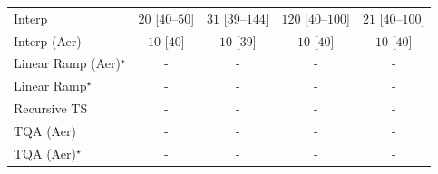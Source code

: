 \begin{tabular}{l|cccc|}
Interp & {\cellcolor[HTML]{F5FBF3}} \color[HTML]{000000} $20$ [$40$--$50$] & {\cellcolor[HTML]{F3FAF0}} \color[HTML]{000000} $31$ [$39$--$144$] & {\cellcolor[HTML]{DCF2D7}} \color[HTML]{000000} $120$ [$40$--$100$] & {\cellcolor[HTML]{F5FBF2}} \color[HTML]{000000} $21$ [$40$--$100$] \\
Interp (Aer) & {\cellcolor[HTML]{F7FCF5}} \color[HTML]{000000} $10$ [$40$] & {\cellcolor[HTML]{F7FCF5}} \color[HTML]{000000} $10$ [$39$] & {\cellcolor[HTML]{F7FCF5}} \color[HTML]{000000} $10$ [$40$] & {\cellcolor[HTML]{F7FCF5}} \color[HTML]{000000} $10$ [$40$] \\
Linear Ramp (Aer)$^\star$ & {\cellcolor[HTML]{000000}} \color[HTML]{F1F1F1} {\cellcolor{white}} \color{black} - & {\cellcolor[HTML]{000000}} \color[HTML]{F1F1F1} {\cellcolor{white}} \color{black} - & {\cellcolor[HTML]{000000}} \color[HTML]{F1F1F1} {\cellcolor{white}} \color{black} - & {\cellcolor[HTML]{000000}} \color[HTML]{F1F1F1} {\cellcolor{white}} \color{black} - \\
Linear Ramp$^\star$ & {\cellcolor[HTML]{000000}} \color[HTML]{F1F1F1} {\cellcolor{white}} \color{black} - & {\cellcolor[HTML]{000000}} \color[HTML]{F1F1F1} {\cellcolor{white}} \color{black} - & {\cellcolor[HTML]{000000}} \color[HTML]{F1F1F1} {\cellcolor{white}} \color{black} - & {\cellcolor[HTML]{000000}} \color[HTML]{F1F1F1} {\cellcolor{white}} \color{black} - \\
Recursive TS & {\cellcolor[HTML]{000000}} \color[HTML]{F1F1F1} {\cellcolor{white}} \color{black} - & {\cellcolor[HTML]{000000}} \color[HTML]{F1F1F1} {\cellcolor{white}} \color{black} - & {\cellcolor[HTML]{000000}} \color[HTML]{F1F1F1} {\cellcolor{white}} \color{black} - & {\cellcolor[HTML]{000000}} \color[HTML]{F1F1F1} {\cellcolor{white}} \color{black} - \\
TQA (Aer) & {\cellcolor[HTML]{000000}} \color[HTML]{F1F1F1} {\cellcolor{white}} \color{black} - & {\cellcolor[HTML]{000000}} \color[HTML]{F1F1F1} {\cellcolor{white}} \color{black} - & {\cellcolor[HTML]{000000}} \color[HTML]{F1F1F1} {\cellcolor{white}} \color{black} - & {\cellcolor[HTML]{000000}} \color[HTML]{F1F1F1} {\cellcolor{white}} \color{black} - \\
TQA (Aer)$^\star$ & {\cellcolor[HTML]{000000}} \color[HTML]{F1F1F1} {\cellcolor{white}} \color{black} - & {\cellcolor[HTML]{000000}} \color[HTML]{F1F1F1} {\cellcolor{white}} \color{black} - & {\cellcolor[HTML]{000000}} \color[HTML]{F1F1F1} {\cellcolor{white}} \color{black} - & {\cellcolor[HTML]{000000}} \color[HTML]{F1F1F1} {\cellcolor{white}} \color{black} - \\

\end{tabular}
